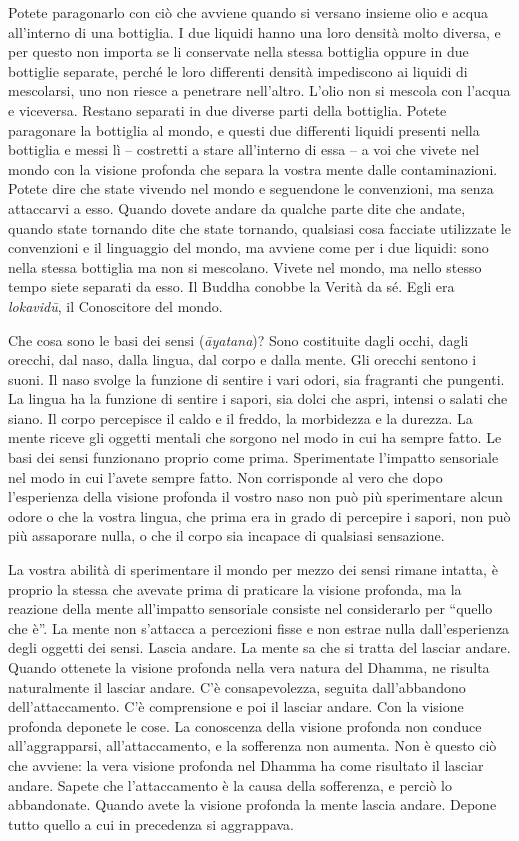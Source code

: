 Potete paragonarlo con ciò che avviene quando si versano insieme olio e
acqua all'interno di una bottiglia. I due liquidi hanno una loro densità
molto diversa, e per questo non importa se li conservate nella stessa
bottiglia oppure in due bottiglie separate, perché le loro differenti
densità impediscono ai liquidi di mescolarsi, uno non riesce a penetrare
nell'altro. L'olio non si mescola con l'acqua e viceversa. Restano
separati in due diverse parti della bottiglia. Potete paragonare la
bottiglia al mondo, e questi due differenti liquidi presenti nella
bottiglia e messi lì -- costretti a stare all'interno di essa -- a voi
che vivete nel mondo con la visione profonda che separa la vostra mente
dalle contaminazioni. Potete dire che state vivendo nel mondo e
seguendone le convenzioni, ma senza attaccarvi a esso. Quando dovete
andare da qualche parte dite che andate, quando state tornando dite che
state tornando, qualsiasi cosa facciate utilizzate le convenzioni e il
linguaggio del mondo, ma avviene come per i due liquidi: sono nella
stessa bottiglia ma non si mescolano. Vivete nel mondo, ma nello stesso
tempo siete separati da esso. Il Buddha conobbe la Verità da sé. Egli
era \emph{lokavidū}, il Conoscitore del mondo.

Che cosa sono le basi dei sensi (\emph{āyatana})? Sono costituite dagli
occhi, dagli orecchi, dal naso, dalla lingua, dal corpo e dalla mente.
Gli orecchi sentono i suoni. Il naso svolge la funzione di sentire i
vari odori, sia fragranti che pungenti. La lingua ha la funzione di
sentire i sapori, sia dolci che aspri, intensi o salati che siano. Il
corpo percepisce il caldo e il freddo, la morbidezza e la durezza. La
mente riceve gli oggetti mentali che sorgono nel modo in cui ha sempre
fatto. Le basi dei sensi funzionano proprio come prima. Sperimentate
l'impatto sensoriale nel modo in cui l'avete sempre fatto. Non
corrisponde al vero che dopo l'esperienza della visione profonda il
vostro naso non può più sperimentare alcun odore o che la vostra lingua,
che prima era in grado di percepire i sapori, non può più assaporare
nulla, o che il corpo sia incapace di qualsiasi sensazione.

La vostra abilità di sperimentare il mondo per mezzo dei sensi rimane
intatta, è proprio la stessa che avevate prima di praticare la visione
profonda, ma la reazione della mente all'impatto sensoriale consiste nel
considerarlo per ``quello che è''. La mente non s'attacca a percezioni
fisse e non estrae nulla dall'esperienza degli oggetti dei sensi. Lascia
andare. La mente sa che si tratta del lasciar andare. Quando ottenete la
visione profonda nella vera natura del Dhamma, ne risulta naturalmente
il lasciar andare. C'è consapevolezza, seguita dall'abbandono
dell'attaccamento. C'è comprensione e poi il lasciar andare. Con la
visione profonda deponete le cose. La conoscenza della visione profonda
non conduce all'aggrapparsi, all'attaccamento, e la sofferenza non
aumenta. Non è questo ciò che avviene: la vera visione profonda nel
Dhamma ha come risultato il lasciar andare. Sapete che l'attaccamento è
la causa della sofferenza, e perciò lo abbandonate. Quando avete la
visione profonda la mente lascia andare. Depone tutto quello a cui in
precedenza si aggrappava.

